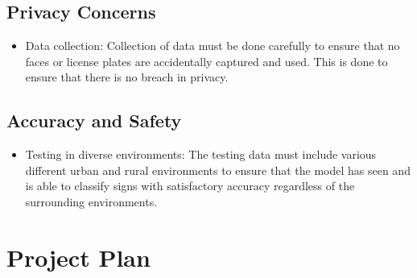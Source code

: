 \documentclass{article} %
\begin{document}
\subsection*{Privacy Concerns}
\begin{itemize}
    \item Data collection: Collection of data must be done carefully to ensure that no faces or license plates are accidentally captured and used. This is done to ensure that there is no breach in privacy.
\end{itemize}

\subsection*{Accuracy and Safety}
\begin{itemize}
    \item Testing in diverse environments: The testing data must include various different urban and rural environments to ensure that the model has seen and is able to classify signs with satisfactory accuracy regardless of the surrounding environments.
\end{itemize}
\newpage


\section{Project Plan}
\end{document}
